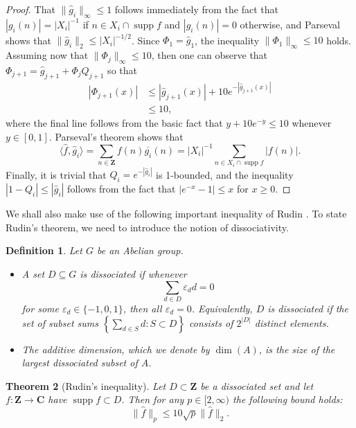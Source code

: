 \documentclass[11pt, reqno]{amsart}
\newtheorem{theorem}{Theorem}[section]
\newtheorem{definition}[theorem]{Definition}
\DeclareMathOperator\supp{supp}
\begin{document}
\begin{proof}
    That $\lVert \hat{g}_i\rVert_\infty\leqslant 1$ follows immediately from the fact that $|g_i(n)|=|X_i|^{-1}$ if $n\in X_i\cap \supp f$ and $|g_i(n)|=0$ otherwise, and Parseval shows that $\lVert \hat{g}_i\rVert_2\leqslant |X_i|^{-1/2}$. Since $\Phi_1=\hat{g}_1$, the inequality $\lVert \Phi_1\rVert_\infty\leqslant 10$ holds. Assuming now that $\lVert \Phi_j\rVert_\infty\leqslant 10$, then one can observe that $\Phi_{j+1}=\hat{g}_{j+1}+\Phi_jQ_{j+1}$ so that
\begin{align*}
    |\Phi_{j+1}(x)|&\leqslant|\hat{g}_{j+1}(x)|+10e^{-|\hat{g}_{j+1}(x)|}\\
    &\leqslant 10,
\end{align*}
where the final line follows from the basic fact that $y+10e^{-y}\leqslant 10$ whenever $y\in[0,1]$. Parseval's theorem shows that
$$\langle \hat{f},\hat{g}_i\rangle =\sum_{n\in\mathbf{Z}}f(n)\overline{g_i}(n)=|X_i|^{-1}\sum_{n\in X_i\cap \supp f}|f(n)|.$$
Finally, it is trivial that $Q_i=e^{-|\hat{g}_i|}$ is 1-bounded, and the inequality $|1-Q_i|\leqslant |\hat{g}_i|$ follows from the fact that $|e^{-x}-1|\leqslant x$ for $x\geqslant0$.
\end{proof}

We shall also make use of the following important inequality of Rudin \cite{rudin}. To state Rudin's theorem, we need to introduce the notion of dissociativity.
\begin{definition}\label{def:addidimensio}
\normalfont Let $G$ be an Abelian group.  
\begin{itemize}
    \item A set $D \subseteq G$ is \emph{dissociated} if whenever $$\sum_{d\in D}\varepsilon_dd=0$$
for some $\varepsilon_d\in\{-1,0,1\}$, then all $\varepsilon_d=0$. Equivalently, $D$ is dissociated if the set of subset sums $\left\{\sum_{d\in S}d:S\subset D\right\}$ consists of $2^{|D|}$ distinct elements. 
\item The \emph{additive dimension}, which we denote by $\dim (A)$, is the size of the largest dissociated subset of $A$.
\end{itemize}


\end{definition}
\begin{theorem}[Rudin's inequality]\label{th:rudin}
    Let $D\subset \mathbf{Z}$ be a dissociated set and let $f:\mathbf{Z}\to\mathbf{C}$ have $\supp f\subset D$. Then for any $p\in[2,\infty)$ the following bound holds:
    \begin{equation*}
        \lVert \hat{f}\rVert_p\leqslant 10\sqrt{p}\lVert \hat{f}\rVert_2.
    \end{equation*}
\end{theorem}
\end{document}
